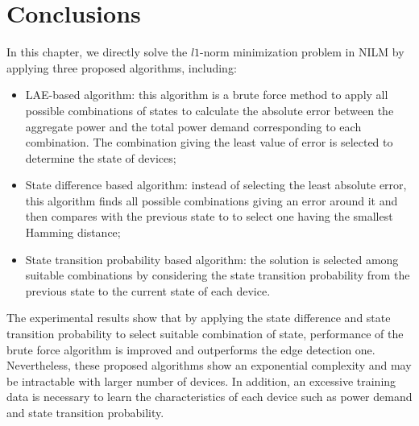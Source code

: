 \section{Conclusions}
In this chapter, we directly solve the $l1$-norm minimization problem in NILM by applying three proposed algorithms, including:
\begin{itemize}
\item LAE-based algorithm: this algorithm is a brute force method to apply all possible combinations of states to calculate the absolute error between the aggregate power and the total power demand corresponding to each combination. The combination giving the least value of error is selected to determine the state of devices;
\item State difference based algorithm: instead of selecting the least absolute error, this algorithm finds all possible combinations giving an error around it and then compares with the previous state to to select one having the smallest Hamming distance;
\item State transition probability based algorithm: the solution is selected among suitable combinations by considering the state transition probability from the previous state to the current state of each device.
\end{itemize}

The experimental results show that by applying the state difference and state transition probability to select suitable combination of state, performance of the brute force algorithm is improved and outperforms the edge detection one. Nevertheless, these proposed algorithms show an exponential complexity and may be intractable with larger number of devices. In addition, an excessive training data is necessary to learn the characteristics of each device such as power demand and state transition probability.